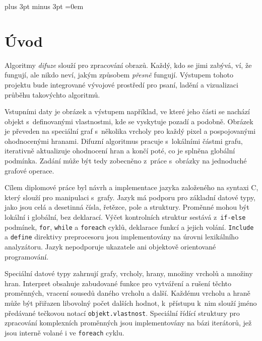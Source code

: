 \documentclass[11pt,twoside,a4paper]{book}
\begin{document}

\cleardoublepage

\tableofcontents
\listoffigures
\listoftables



\mainbodystarts

\parskip=5pt plus 3pt minus 3pt
\parindent=0em



\chapter{Úvod}

Algoritmy \textit{difuze} slouží pro zpracování obrazů. Každý, kdo se jimi zabývá, ví, že fungují, ale nikdo neví, jakým způsobem \textit{přesně} fungují. Výstupem tohoto projektu bude integrované vývojové prostředí pro psaní, ladění a vizualizaci průběhu takovýchto algoritmů.

Vstupními daty je obrázek a výstupem například, ve které jeho části se nachází objekt s~definovanými vlastnostmi, kde se vyskytuje pozadí a podobně. Obrázek je převeden na speciální graf s~několika vrcholy pro každý pixel a pospojovanými ohodnocenými hranami. Difuzní algoritmus pracuje s~lokálními částmi grafu, iterativně aktualizuje ohodnocení hran a končí poté, co je splněna globální podmínka. Zadání může být tedy zobecněno z~práce s~obrázky na jednoduché grafové operace.

Cílem diplomové práce byl návrh a implementace jazyka založeného na syntaxi C, který slouží pro manipulaci s~grafy. Jazyk má podporu pro základní datové typy, jako jsou celá a desetinná čísla, řetězce, pole a struktury. Proměnné mohou být lokální i globální, bez deklarací. Výčet kontrolních struktur sestává z~\texttt{if-else} podmínek, \texttt{for}, \texttt{while} a \texttt{foreach} cyklů, deklarace funkcí a jejich volání. \texttt{Include} a \texttt{define} direktivy preprocesoru jsou implementovány na úrovni lexikálního analyzátoru. Jazyk nepodporuje ukazatele ani objektově orientované programování.

Speciální datové typy zahrnují grafy, vrcholy, hrany, množiny vrcholů a množiny hran. Interpret obsahuje zabudované funkce pro vytváření a rušení těchto proměnných, vracení sousedů daného vrcholu a další. Každému vrcholu a hraně může být přiřazen libovolný počet dalších hodnot, k~přístupu k~nim slouží jméno předávané tečkovou notací \texttt{objekt.vlastnost}. Speciální řídící struktury pro zpracování komplexních proměnných jsou implementovány na bázi iterátorů, jež jsou interně volané i ve \texttt{foreach} cyklu.
\end{document}
